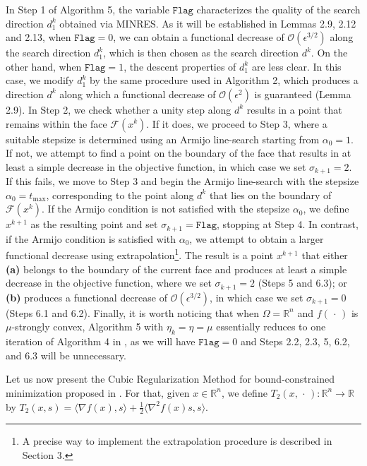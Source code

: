\documentclass[11pt]{article}
\begin{document}
In Step 1 of Algorithm 5, the variable $\texttt{Flag}$ characterizes the quality of the search direction $d_{1}^{k}$ obtained via MINRES. As it will be established in Lemmas 2.9, 2.12 and 2.13, when $\texttt{Flag}=0$, we can obtain a functional decrease of $\mathcal{O}(\epsilon^{3/2})$ along the search direction $d_{1}^{k}$, which is then chosen as the search direction $d^{k}$. On the other hand, when $\texttt{Flag}=1$, the descent properties of $d_{1}^{k}$ are less clear. In this case, we modify $d_{1}^{k}$ by the same procedure used in Algorithm 2, which produces a direction $d^{k}$ along which a functional decrease of $\mathcal{O}(\epsilon^{2})$ is guaranteed (Lemma 2.9). In Step 2, we check whether a unity step along \( d^{k} \) results in a point that remains within the face \( \mathcal{F}(x^{k}) \). If it does, we proceed to Step 3, where a suitable stepsize is determined using an Armijo line-search starting from \( \alpha_0 = 1 \). If not, we attempt to find a point on the boundary of the face that results in at least a simple decrease in the objective function, in which case we set $\sigma_{k+1}=2$. If this fails, we move to Step 3 and begin the Armijo line-search with the stepsize \( \alpha_0 = t_{\max} \), corresponding to the point along \( d^{k} \) that lies on the boundary of \( \mathcal{F}(x^{k}) \). If the Armijo condition is not satisfied with the stepsize \( \alpha_0 \), we define \( x^{k+1} \) as the resulting point and set \( \sigma_{k+1} = \texttt{Flag} \), stopping at Step 4. In contrast, if the Armijo condition is satisfied with \( \alpha_0 \), we attempt to obtain a larger functional decrease using extrapolation\footnote{A precise way to implement the extrapolation procedure is described in Section 3.}. The result is a point \( x^{k+1} \) that either \textbf{(a)} belongs to the boundary of the current face and produces at least a simple decrease in the objective function, where we set \( \sigma_{k+1} = 2 \) (Steps 5 and 6.3); or \textbf{(b)} produces a functional decrease of \( \mathcal{O}(\epsilon^{3/2}) \), in which case we set \( \sigma_{k+1} = 0 \) (Steps 6.1 and 6.2). Finally, it is worth noticing that when $\Omega=\mathbb{R}^{n}$ and $f(\,\cdot\,)$ is $\mu$-strongly convex, Algorithm 5 with $\eta_{k}=\eta=\mu$ essentially reduces to one iteration of Algorithm 4 in \cite{Liu2023}, as we will have $\texttt{Flag}=0$ and Steps 2.2, 2.3, 5, 6.2, and 6.3 will be unnecessary.

Let us now present the Cubic Regularization Method for bound-constrained minimization proposed in \cite{BM}. For that, given $x\in\mathbb{R}^{n}$, we define $T_{2}(x,\,\cdot\,):\mathbb{R}^{n}\to\mathbb{R}$ by $T_{2}(x,s)=\langle\nabla f(x),s\rangle+\frac{1}{2}\langle\nabla^{2}f(x)s,s\rangle$.
\end{document}
